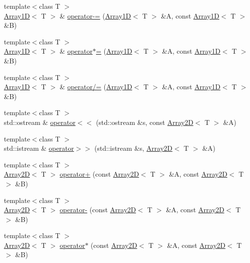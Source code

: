 \begin{DoxyCompactItemize}
\item 
{\footnotesize template$<$class T $>$ }\\\hyperlink{classTNT_1_1Array1D}{Array1\-D}$<$ T $>$ \& \hyperlink{namespaceTNT_a299b0b9df874413857065f22f8ca5a91}{operator-\/=} (\hyperlink{classTNT_1_1Array1D}{Array1\-D}$<$ T $>$ \&A, const \hyperlink{classTNT_1_1Array1D}{Array1\-D}$<$ T $>$ \&B)
\item 
{\footnotesize template$<$class T $>$ }\\\hyperlink{classTNT_1_1Array1D}{Array1\-D}$<$ T $>$ \& \hyperlink{namespaceTNT_a89bc7f14ed053648fc3cccef34955019}{operator$\ast$=} (\hyperlink{classTNT_1_1Array1D}{Array1\-D}$<$ T $>$ \&A, const \hyperlink{classTNT_1_1Array1D}{Array1\-D}$<$ T $>$ \&B)
\item 
{\footnotesize template$<$class T $>$ }\\\hyperlink{classTNT_1_1Array1D}{Array1\-D}$<$ T $>$ \& \hyperlink{namespaceTNT_a3be75d39e2081a4f4876050b36b29403}{operator/=} (\hyperlink{classTNT_1_1Array1D}{Array1\-D}$<$ T $>$ \&A, const \hyperlink{classTNT_1_1Array1D}{Array1\-D}$<$ T $>$ \&B)
\item 
{\footnotesize template$<$class T $>$ }\\std\-::ostream \& \hyperlink{namespaceTNT_a016e1f9f0eb43642e6d41748b4dd1199}{operator$<$$<$} (std\-::ostream \&s, const \hyperlink{classTNT_1_1Array2D}{Array2\-D}$<$ T $>$ \&A)
\item 
{\footnotesize template$<$class T $>$ }\\std\-::istream \& \hyperlink{namespaceTNT_a2856dd71c9307b44e65cc69a98a3b102}{operator$>$$>$} (std\-::istream \&s, \hyperlink{classTNT_1_1Array2D}{Array2\-D}$<$ T $>$ \&A)
\item 
{\footnotesize template$<$class T $>$ }\\\hyperlink{classTNT_1_1Array2D}{Array2\-D}$<$ T $>$ \hyperlink{namespaceTNT_a410445519880e60d6110b1678e701b20}{operator+} (const \hyperlink{classTNT_1_1Array2D}{Array2\-D}$<$ T $>$ \&A, const \hyperlink{classTNT_1_1Array2D}{Array2\-D}$<$ T $>$ \&B)
\item 
{\footnotesize template$<$class T $>$ }\\\hyperlink{classTNT_1_1Array2D}{Array2\-D}$<$ T $>$ \hyperlink{namespaceTNT_ad9068d45e117245c3ec39ee1f7f33f35}{operator-\/} (const \hyperlink{classTNT_1_1Array2D}{Array2\-D}$<$ T $>$ \&A, const \hyperlink{classTNT_1_1Array2D}{Array2\-D}$<$ T $>$ \&B)
\item 
{\footnotesize template$<$class T $>$ }\\\hyperlink{classTNT_1_1Array2D}{Array2\-D}$<$ T $>$ \hyperlink{namespaceTNT_a96071349bb182069d12392430b5113fe}{operator$\ast$} (const \hyperlink{classTNT_1_1Array2D}{Array2\-D}$<$ T $>$ \&A, const \hyperlink{classTNT_1_1Array2D}{Array2\-D}$<$ T $>$ \&B)

\end{DoxyCompactItemize}
